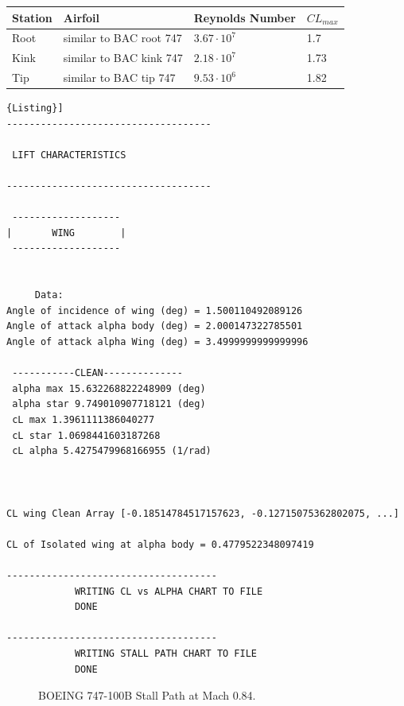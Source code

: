 \begin{center}
	\begin{tabular}{ | l | l | l | l |}
		\hline
		Station & Airfoil & Reynolds Number & $CL_{max}$ \\ \hline
		Root & similar to BAC root 747 & $3.67 \cdot 10^7$ & 1.7 \\ \hline
		Kink & similar to BAC kink 747 &  $2.18 \cdot 10^7$ & 1.73 \\ \hline
		Tip & similar to BAC tip 747 & $9.53 \cdot 10^6$ & 1.82 \\
		\hline
	\end{tabular}
\end{center}



\begin{lstlisting}[caption={{\footnotesize Lift Characteristics of a Lifting Surface - Results. BOEING 747-100B for M=0.84}},label= [style=\bfseries]{Listing}]
------------------------------------

 LIFT CHARACTERISTICS  

------------------------------------

 ------------------- 
|       WING        |
 ------------------- 


	 Data: 
Angle of incidence of wing (deg) = 1.500110492089126
Angle of attack alpha body (deg) = 2.000147322785501
Angle of attack alpha Wing (deg) = 3.4999999999999996

 -----------CLEAN-------------- 
 alpha max 15.632268822248909 (deg)
 alpha star 9.749010907718121 (deg)
 cL max 1.3961111386040277
 cL star 1.0698441603187268
 cL alpha 5.4275479968166955 (1/rad)



CL wing Clean Array [-0.18514784517157623, -0.12715075362802075, ...]

CL of Isolated wing at alpha body = 0.4779522348097419

-------------------------------------
	 	 	WRITING CL vs ALPHA CHART TO FILE  
	 	 	DONE  

-------------------------------------
	 	 	WRITING STALL PATH CHART TO FILE  
	 	 	DONE  

\end{lstlisting}


\begin{figure}[H]
\centering

\caption{BOEING 747-100B Stall Path at Mach 0.84.}
\label{fig:stallB}
\end{figure}


